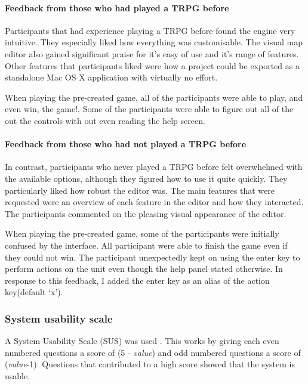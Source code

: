 \paragraph{Feedback from those who had played a TRPG before\\}
Participants that had experience playing a TRPG before found the engine very intuitive. They especially liked how everything was customisable.  The visual map editor also gained significant praise for it's easy of use and it's range of features.  Other features that participants liked were how a project could be exported as a standalone Mac OS X application with virtually no effort. 

When playing the pre-created game, all of the participants were able to play, and even win, the game!. Some of the participants were able to figure out all of the out the controls with out even reading the help screen. 

\paragraph{Feedback from those who had not played a TRPG  before\\} 
In contrast, participants who never played a TRPG before felt overwhelmed with the available options, although they figured how to use it quite quickly.  They particularly liked how robust the editor was. The main features that were requested were  an overview of each feature in the editor and how they interacted.  The participants commented on the pleasing visual appearance of the editor.

When playing the pre-created game, some of the participants were initially confused by the interface. All participant were able to finish the game even if they could not win.  The participant unexpectedly kept on using the enter key to perform actions on the unit even though the help panel stated otherwise. In response to this feedback, I added the enter key as an alias of the action key(default `x').

\subsubsection{System usability scale}
A System Usability Scale (SUS) was used \cite{SUS}. This works by giving each even numbered questions a score of (5 - \emph{value}) and odd numbered questions a score of (\emph{value}-1). Questions that contributed to a high score showed that the system is usable. 


